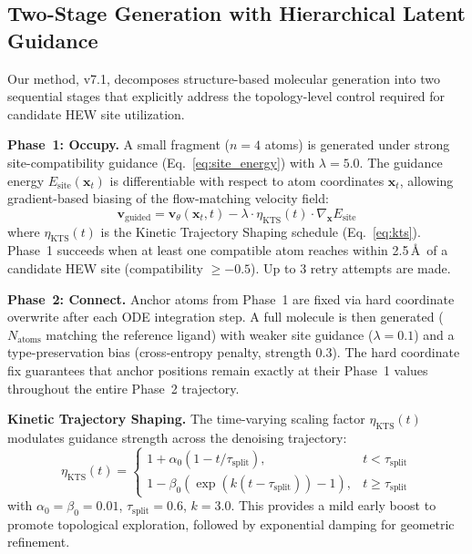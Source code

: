 \subsection{Two-Stage Generation with Hierarchical Latent Guidance}

Our method, v7.1, decomposes structure-based molecular generation into two
sequential stages that explicitly address the topology-level control required
for candidate HEW site utilization.

\textbf{Phase~1: Occupy.}
A small fragment ($n=4$ atoms) is generated under strong site-compatibility
guidance (Eq.~\ref{eq:site_energy}) with $\lambda=5.0$.
The guidance energy $E_{\text{site}}(\mathbf{x}_t)$ is differentiable with
respect to atom coordinates $\mathbf{x}_t$, allowing gradient-based biasing
of the flow-matching velocity field:
\begin{equation}
\mathbf{v}_{\text{guided}} = \mathbf{v}_\theta(\mathbf{x}_t, t) -
\lambda \cdot \eta_{\text{KTS}}(t) \cdot \nabla_{\mathbf{x}} E_{\text{site}}
\end{equation}
where $\eta_{\text{KTS}}(t)$ is the Kinetic Trajectory Shaping schedule
(Eq.~\ref{eq:kts}). Phase~1 succeeds when at least one compatible atom
reaches within 2.5\,\AA\ of a candidate HEW site (compatibility
$\geq -0.5$). Up to 3 retry attempts are made.

\textbf{Phase~2: Connect.}
Anchor atoms from Phase~1 are fixed via hard coordinate overwrite after
each ODE integration step. A full molecule is then generated
($N_{\text{atoms}}$ matching the reference ligand) with weaker site guidance
($\lambda=0.1$) and a type-preservation bias (cross-entropy penalty,
strength 0.3). The hard coordinate fix guarantees that anchor positions
remain exactly at their Phase~1 values throughout the entire Phase~2
trajectory.

\textbf{Kinetic Trajectory Shaping.}
The time-varying scaling factor $\eta_{\text{KTS}}(t)$ modulates guidance
strength across the denoising trajectory:
\begin{equation}\label{eq:kts}
\eta_{\text{KTS}}(t) =
\begin{cases}
1 + \alpha_0 (1 - t/\tau_{\text{split}}), & t < \tau_{\text{split}} \\
1 - \beta_0 (\exp(k(t-\tau_{\text{split}})) - 1), & t \geq \tau_{\text{split}}
\end{cases}
\end{equation}
with $\alpha_0=\beta_0=0.01$, $\tau_{\text{split}}=0.6$, $k=3.0$.
This provides a mild early boost to promote topological exploration,
followed by exponential damping for geometric refinement.
